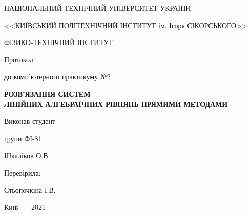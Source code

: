 \thispagestyle{empty}

\begin{center}
НАЦІОНАЛЬНИЙ ТЕХНІЧНИЙ УНІВЕРСИТЕТ УКРАЇНИ \par
<<КИЇВСЬКИЙ ПОЛІТЕХНІЧНИЙ ІНСТИТУТ ім. Ігоря СІКОРСЬКОГО>>\par
ФІЗИКО-ТЕХНІЧНИЙ ІНСТИТУТ\par

\vspace{5cm}
{\huge Протокол \par до комп’ютерного практикуму №2 \par}

\vspace{1cm}
\huge\MakeUppercase{\textbf{ РОЗВ’ЯЗАННЯ СИСТЕМ \\ ЛІНІЙНИХ
АЛГЕБРАЇЧНИХ РІВНЯНЬ ПРЯМИМИ МЕТОДАМИ }} \par
\end{center}

\vspace{2cm}
\begin{flushright}
Виконав студент

групи ФІ-81

\bigbreak

Шкаліков О.В.

\vspace{20mm}
Перевірила:

Стьопочкіна І.В.

\end{flushright}

\vspace{3cm}
\begin{center}
{Київ~--- 2021}
\end{center}

\newpage
